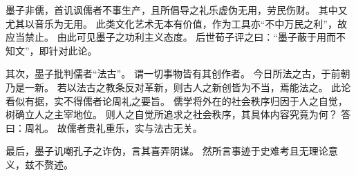 \documentclass[11pt]{article}
\begin{document}
\newline

墨子非儒，首讥讽儒者不事生产，且所倡导之礼乐虚伪无用，劳民伤财。
其中又尤其以音乐为无用。
此类文化艺术无本有价值，作为工具亦“不中万民之利”，故应当禁止。
由此可见墨子之功利主义态度。
后世荀子评之曰：“墨子蔽于用而不知文”，即针对此论。

\newline

其次，墨子批判儒者“法古”。
谓一切事物皆有其创作者。
今日所法之古，于前朝乃是一新。
若以法古之教条反对革新，则古人之新创皆为不当，焉能法之。
此论看似有据，实不得儒者论周礼之要旨。
儒学将外在的社会秩序归因于人之自觉，树确立人之主宰地位。
则人之自觉所追求之社会秩序，其具体内容究竟为何？
答曰：周礼。
故儒者贵礼重乐，实与法古无关。

\newline

最后，墨子讥嘲孔子之诈伪，言其喜弄阴谋。
然所言事迹于史难考且无理论意义，兹不赘述。
\end{document}
